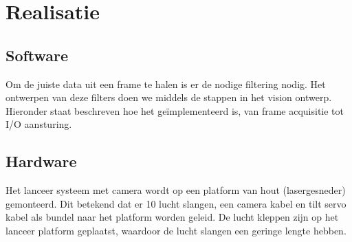 \chapter{Realisatie}
\label{chap:realisation}


\section{Software}

Om de juiste data uit een frame te halen is er de nodige filtering nodig.
Het ontwerpen van deze filters doen we middels de stappen in het vision ontwerp.
Hieronder staat beschreven hoe het geïmplementeerd is, van frame acquisitie tot
I/O aansturing.













\section{Hardware}
\label{sec:hardware}

Het lanceer systeem met camera wordt op een platform van hout (lasergesneder)
gemonteerd. Dit betekend dat er 10 lucht slangen, een camera kabel en tilt servo
kabel als bundel naar het platform worden geleid. De lucht kleppen zijn op het
lanceer platform geplaatst, waardoor de lucht slangen een geringe lengte hebben.










